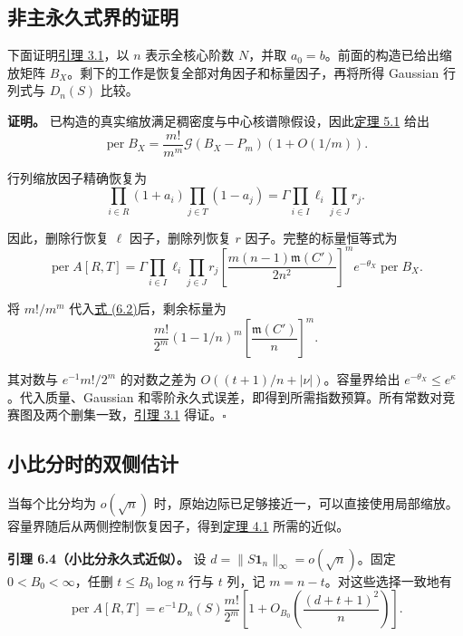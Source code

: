 \documentclass[11pt,a4paper]{article}
\makeatletter
\newcommand{\paperstatement}[3]{\par\addvspace{6pt}\Needspace{4\baselineskip}\phantomsection\def\@currentlabel{#2}\label{#3}\noindent\textbf{#1}\enspace}
\newcommand{\paperref}[2]{\hyperref[#1]{#2}}
\makeatother
\begin{document}
\subsection{非主永久式界的证明}\label{sec-6.4}

下面证明\paperref{thm-3.1}{引理 3.1}，以 \(n\) 表示全核心阶数 \(N\)，并取 \(a_0=b\)。前面的构造已给出缩放矩阵 \(B_X\)。剩下的工作是恢复全部对角因子和标量因子，再将所得 Gaussian 行列式与 \(D_n(S)\) 比较。

\textbf{证明。} 已构造的真实缩放满足稠密度与中心核谱隙假设，因此\paperref{thm-5.1}{定理 5.1} 给出
\[\operatorname{per}B_X=\frac{m!}{m^m}\mathcal G(B_X-P_m)(1+O(1/m)).\]

行列缩放因子精确恢复为
\[\prod_{i\in R}(1+a_i)\prod_{j\in T}(1-a_j)=\Gamma\prod_{i\in I}\ell_i\prod_{j\in J}r_j.\]

因此，删除行恢复 \(\ell\) 因子，删除列恢复 \(r\) 因子。完整的标量恒等式为
\begin{equation}
\operatorname{per}A[R,T]=\Gamma\prod_{i\in I}\ell_i\prod_{j\in J}r_j\left[\frac{m(n-1)\mathfrak m(C')}{2n^2}\right]^m e^{-\theta_X}\operatorname{per}B_X.
\tag{6.2}\label{eq-exact-restoration}
\end{equation}

将 \(m!/m^m\) 代入\paperref{eq-exact-restoration}{式 (6.2)}后，剩余标量为
\[\frac{m!}{2^m}(1-1/n)^m\left[\frac{\mathfrak m(C')}{n}\right]^m.\]

其对数与 \(e^{-1}m!/2^m\) 的对数之差为 \(O((t+1)/n+|\nu|)\)。容量界给出 \(e^{-\theta_X}\le e^\kappa\)。代入质量、Gaussian 和零阶永久式误差，即得到所需指数预算。所有常数对竞赛图及两个删集一致，\paperref{thm-3.1}{引理 3.1} 得证。\nobreak\hspace{.5em}\mbox{$\square$}

\subsection{小比分时的双侧估计}\label{sec-6.5}

当每个比分均为 \(o(\sqrt n)\) 时，原始边际已足够接近一，可以直接使用局部缩放。容量界随后从两侧控制恢复因子，得到\paperref{thm-4.1}{定理 4.1} 所需的近似。

\paperstatement{引理 6.4（小比分永久式近似）。}{6.4}{thm-6.4} 设 \(d=\|S\mathbf 1_n\|_\infty=o(\sqrt n)\)。固定 \(0<B_0<\infty\)，任删 \(t\le B_0\log n\) 行与 \(t\) 列，记 \(m=n-t\)。对这些选择一致地有
\begin{equation}
\operatorname{per}A[R,T]=e^{-1}D_n(S)\frac{m!}{2^m}\left[1+O_{B_0}\left(\frac{(d+t+1)^2}{n}\right)\right].
\tag{6.3}\label{eq-small-score-permanent}
\end{equation}
\end{document}
